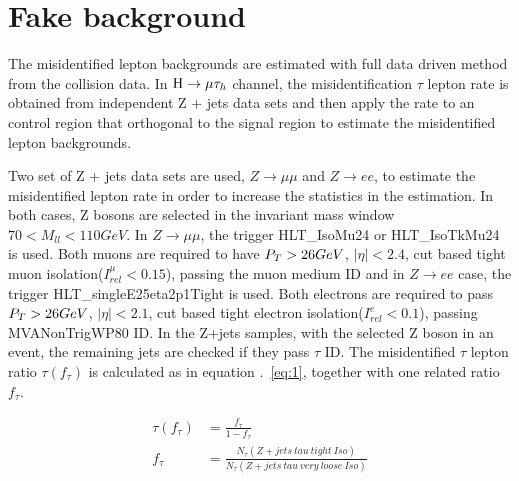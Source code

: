 %
%
%
%
%
%
%
%
%
%

%
%

\chapter{Fake background}

The misidentified lepton backgrounds are estimated with full data driven method from the collision data. In $\mathrm{H}\to \mu\tau_{h}$ channel,  the misidentification $\tau$ lepton rate is obtained from independent Z + jets data sets and then apply the rate to an control region that orthogonal to the signal region to estimate the misidentified lepton backgrounds. 

Two set of Z + jets data sets are used, $Z\rightarrow\mu\mu$ and $Z\rightarrow e e$, to estimate the misidentified lepton rate in order to increase the statistics in the estimation.  In both cases, Z bosons are selected in the invariant mass window $70<M_{ll}<110 GeV$. In $Z\rightarrow\mu\mu$, the trigger HLT\_IsoMu24 or HLT\_IsoTkMu24 is used. Both muons are required to have $P_{T}>26 GeV$, $|\eta|<2.4$, cut based tight muon isolation($I^{\mu}_{rel}<0.15$), passing the muon medium ID   and in $Z\rightarrow e e$ case,  the trigger HLT\_singleE25eta2p1Tight is used. Both electrons are required to pass $P_{T}>26 GeV$, $|\eta|<2.1$, cut based tight electron isolation($I^{e}_{rel}<0.1$), passing MVANonTrigWP80 ID. In the Z+jets samples, with the selected Z boson in an event, the remaining jets are checked if they pass $\tau$ ID. The misidentified $\tau$ lepton ratio $\tau(f_{\tau})$ is calculated as in equation .~\ref{eq:1}, together with one related ratio $f_{\tau}$.

\begin{align} \label{eq:1}
\tau(f_{\tau})&=\frac{f_{\tau}}{1-f_{\tau}}\\
f_{\tau}&=\frac{N_{\tau}(Z+jets\ tau\ tight\ Iso)}{N_{\tau}(Z+jets\ tau\ very\ loose\ Iso)}
\end{align}

